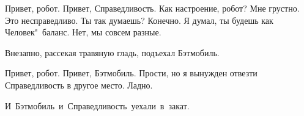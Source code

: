 \begin{dialog}
\X Привет, робот.
\R Привет, Справедливость.
\X Как настроение, робот?
\R Мне грустно.
\X Это несправедливо.
\R Ты так думаешь?
\X Конечно.
\R Я думал, ты будешь как Человек"~баланс.
\X Нет, мы совсем разные.
\end{dialog}

\begin{monolog}
Внезапно, рассекая травяную гладь, подъехал Бэтмобиль.
\end{monolog}

\begin{dialog}
\Y Привет, робот.
\R Привет, Бэтмобиль.
\Y Прости, но я вынужден отвезти Справедливость в другое место.
\R Ладно.
\end{dialog}

\begin{monolog}
\mbox{И Бэтмобиль и Справедливость уехали в закат.}
\end{monolog}
